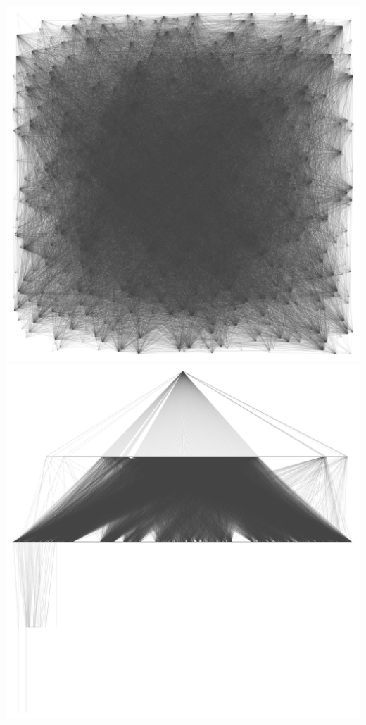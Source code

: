 \documentclass[12pt, a4paper]{article}
\begin{document}
\begin{multicols}{2}
  {\centering
  \includegraphics[width=\columnwidth]{src/youtube/hdg/comp/8_plot_random}\\
  \label{fig:hdg_c8}}
  {\centering
  \includegraphics[width=\columnwidth]{src/youtube/hdg/comp/9_plot_sgy}
  \label{fig:hdg_c9}}
\end{multicols}
\end{document}

